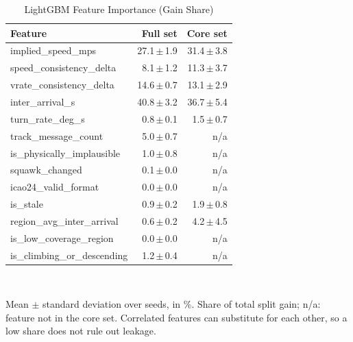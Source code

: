 \begin{table}[t]
\centering
\footnotesize
\caption{LightGBM Feature Importance (Gain Share)}
\label{tab:importance}
\setlength{\tabcolsep}{4pt}
\begin{tabular}{lrr}
\toprule
Feature & Full set & Core set \\
\midrule
implied\_speed\_mps & 27.1{\,}$\pm${\,}1.9 & 31.4{\,}$\pm${\,}3.8 \\
speed\_consistency\_delta & 8.1{\,}$\pm${\,}1.2 & 11.3{\,}$\pm${\,}3.7 \\
vrate\_consistency\_delta & 14.6{\,}$\pm${\,}0.7 & 13.1{\,}$\pm${\,}2.9 \\
inter\_arrival\_s & 40.8{\,}$\pm${\,}3.2 & 36.7{\,}$\pm${\,}5.4 \\
turn\_rate\_deg\_s & 0.8{\,}$\pm${\,}0.1 & 1.5{\,}$\pm${\,}0.7 \\
track\_message\_count & 5.0{\,}$\pm${\,}0.7 & n/a \\
is\_physically\_implausible & 1.0{\,}$\pm${\,}0.8 & n/a \\
squawk\_changed & 0.1{\,}$\pm${\,}0.0 & n/a \\
icao24\_valid\_format & 0.0{\,}$\pm${\,}0.0 & n/a \\
is\_stale & 0.9{\,}$\pm${\,}0.2 & 1.9{\,}$\pm${\,}0.8 \\
region\_avg\_inter\_arrival & 0.6{\,}$\pm${\,}0.2 & 4.2{\,}$\pm${\,}4.5 \\
is\_low\_coverage\_region & 0.0{\,}$\pm${\,}0.0 & n/a \\
is\_climbing\_or\_descending & 1.2{\,}$\pm${\,}0.4 & n/a \\
\bottomrule
\end{tabular}
\\[2pt]
\parbox{\linewidth}{\scriptsize Mean $\pm$ standard deviation over  seeds, in \%. Share of total split gain; n/a: feature not in the core set. Correlated features can substitute for each other, so a low share does not rule out leakage.}
\end{table}
